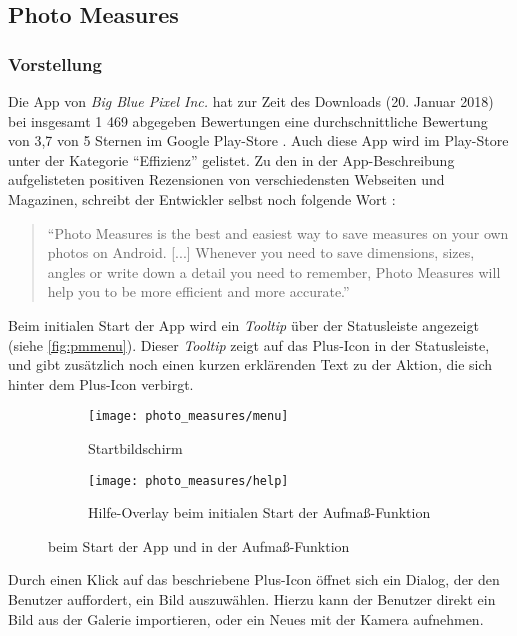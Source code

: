 \subsection{Photo Measures}

\subsubsection{Vorstellung}
Die App \pm{} von \emph{Big Blue Pixel Inc.} hat zur Zeit des Downloads (20. Januar 2018) bei insgesamt 1 469 abgegeben Bewertungen eine durchschnittliche Bewertung von 3,7 von 5 Sternen im Google Play-Store \citep{PixelPM}.
Auch diese App wird im Play-Store unter der Kategorie ``Effizienz'' gelistet.
Zu den in der App-Beschreibung aufgelisteten positiven Rezensionen von verschiedensten Webseiten und Magazinen, schreibt der Entwickler selbst noch folgende Wort \citep{PixelPM}:

\begin{quote}
  ``Photo Measures is the best and easiest way to save measures on your own photos on Android.
  [...] Whenever you need to save dimensions, sizes, angles or write down a detail you need to remember, Photo Measures will help you to be more efficient and more accurate.''
\end{quote}

\noindent
Beim initialen Start der App wird ein \emph{Tooltip} über der Statusleiste angezeigt (siehe \autoref{fig:pmmenu}).
Dieser \emph{Tooltip} zeigt auf das Plus-Icon in der Statusleiste, und gibt zusätzlich noch einen kurzen erklärenden Text zu der Aktion, die sich hinter dem Plus-Icon verbirgt.

\begin{figure}[h]
  \centering
  \begin{subfigure}[t]{0.4\textwidth}
    \texttt{[image: photo\_measures/menu]}
    \caption{Startbildschirm}
    \label{fig:pmmenu}	
  \end{subfigure}
  \begin{subfigure}[t]{0.4\textwidth}
    \texttt{[image: photo\_measures/help]}
    \caption{Hilfe-Overlay beim initialen Start der Aufmaß-Funktion} 
    \label{fig:pmhelp}	
  \end{subfigure}
  \caption{\pm{} beim Start der App und in der Aufmaß-Funktion}
\end{figure}

\noindent
Durch einen Klick auf das beschriebene Plus-Icon öffnet sich ein Dialog, der den Benutzer auffordert, ein Bild auszuwählen.
Hierzu kann der Benutzer direkt ein Bild aus der Galerie importieren, oder ein Neues mit der Kamera aufnehmen. \\

